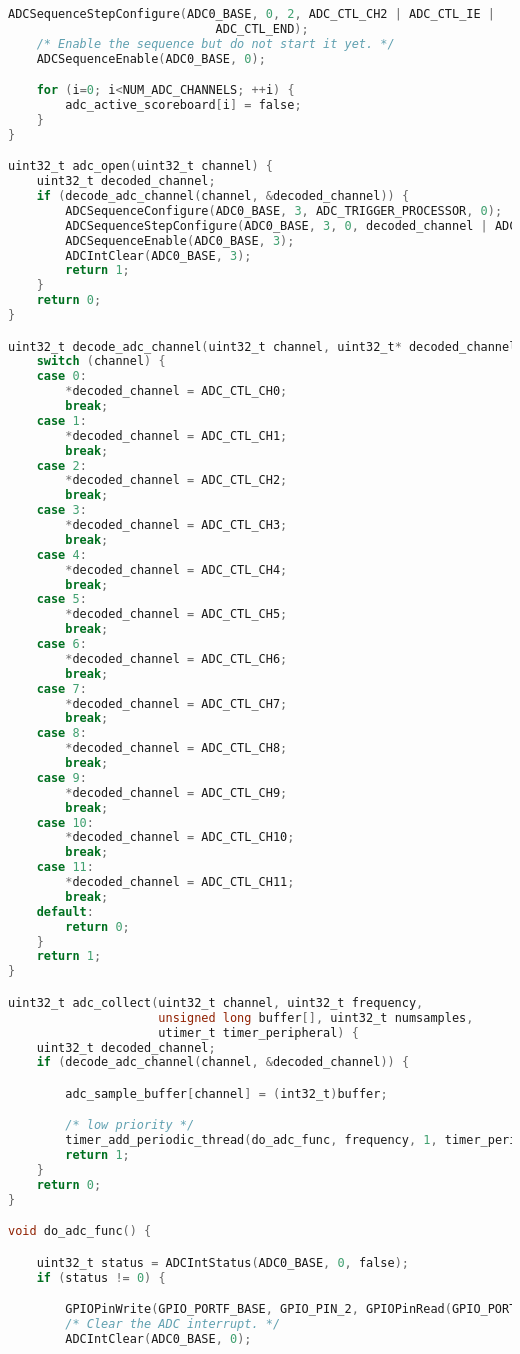 \documentclass[12pt]{article}
\begin{document}
\begin{enumerate}[1)]
\begin{lstlisting}[language=C]
    ADCSequenceStepConfigure(ADC0_BASE, 0, 2, ADC_CTL_CH2 | ADC_CTL_IE |
                             ADC_CTL_END);
    /* Enable the sequence but do not start it yet. */
    ADCSequenceEnable(ADC0_BASE, 0);

    for (i=0; i<NUM_ADC_CHANNELS; ++i) {
        adc_active_scoreboard[i] = false;
    }
}

uint32_t adc_open(uint32_t channel) {
    uint32_t decoded_channel;
    if (decode_adc_channel(channel, &decoded_channel)) {
        ADCSequenceConfigure(ADC0_BASE, 3, ADC_TRIGGER_PROCESSOR, 0);
        ADCSequenceStepConfigure(ADC0_BASE, 3, 0, decoded_channel | ADC_CTL_IE | ADC_CTL_END);
        ADCSequenceEnable(ADC0_BASE, 3);
        ADCIntClear(ADC0_BASE, 3);
        return 1;
    }
    return 0;
}

uint32_t decode_adc_channel(uint32_t channel, uint32_t* decoded_channel) {
    switch (channel) {
    case 0:
        *decoded_channel = ADC_CTL_CH0;
        break;
    case 1:
        *decoded_channel = ADC_CTL_CH1;
        break;
    case 2:
        *decoded_channel = ADC_CTL_CH2;
        break;
    case 3:
        *decoded_channel = ADC_CTL_CH3;
        break;
    case 4:
        *decoded_channel = ADC_CTL_CH4;
        break;
    case 5:
        *decoded_channel = ADC_CTL_CH5;
        break;
    case 6:
        *decoded_channel = ADC_CTL_CH6;
        break;
    case 7:
        *decoded_channel = ADC_CTL_CH7;
        break;
    case 8:
        *decoded_channel = ADC_CTL_CH8;
        break;
    case 9:
        *decoded_channel = ADC_CTL_CH9;
        break;
    case 10:
        *decoded_channel = ADC_CTL_CH10;
        break;
    case 11:
        *decoded_channel = ADC_CTL_CH11;
        break;
    default:
        return 0;
    }
    return 1;
}

uint32_t adc_collect(uint32_t channel, uint32_t frequency,
                     unsigned long buffer[], uint32_t numsamples,
                     utimer_t timer_peripheral) {
    uint32_t decoded_channel;
    if (decode_adc_channel(channel, &decoded_channel)) {

        adc_sample_buffer[channel] = (int32_t)buffer;

        /* low priority */
        timer_add_periodic_thread(do_adc_func, frequency, 1, timer_peripheral);
        return 1;
    }
    return 0;
}

void do_adc_func() {

    uint32_t status = ADCIntStatus(ADC0_BASE, 0, false);
    if (status != 0) {

        GPIOPinWrite(GPIO_PORTF_BASE, GPIO_PIN_2, GPIOPinRead(GPIO_PORTF_BASE, GPIO_PIN_2) ^ GPIO_PIN_2);
        /* Clear the ADC interrupt. */
        ADCIntClear(ADC0_BASE, 0);


\end{lstlisting}
\end{enumerate}
\end{document}
